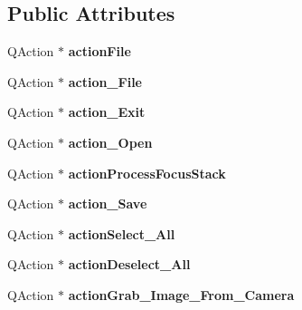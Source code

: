 \subsection*{Public Attributes}
\begin{DoxyCompactItemize}
\item 
\mbox{\label{class_ui___main_window_ae2f5c6fb696d5c3c2adb5be43ae4ab8d}} 
Q\+Action $\ast$ {\bfseries action\+File}
\item 
\mbox{\label{class_ui___main_window_a2a0779eda3ee6e9dceb4fcb319f11d3c}} 
Q\+Action $\ast$ {\bfseries action\+\_\+\+File}
\item 
\mbox{\label{class_ui___main_window_a3710f686be93bfd53122528bd18d08fa}} 
Q\+Action $\ast$ {\bfseries action\+\_\+\+Exit}
\item 
\mbox{\label{class_ui___main_window_a8519e56bcc446c498bcba56d30b3dee4}} 
Q\+Action $\ast$ {\bfseries action\+\_\+\+Open}
\item 
\mbox{\label{class_ui___main_window_adeda788592a9f6400933354b32f3f3f2}} 
Q\+Action $\ast$ {\bfseries action\+Process\+Focus\+Stack}
\item 
\mbox{\label{class_ui___main_window_a20bbf5ae40051241791821693116aaf4}} 
Q\+Action $\ast$ {\bfseries action\+\_\+\+Save}
\item 
\mbox{\label{class_ui___main_window_a69864a890d2467b5a25af9d6ae865cda}} 
Q\+Action $\ast$ {\bfseries action\+Select\+\_\+\+All}
\item 
\mbox{\label{class_ui___main_window_a546e78e85656dc4119cfcffa12f5efdf}} 
Q\+Action $\ast$ {\bfseries action\+Deselect\+\_\+\+All}
\item 
\mbox{\label{class_ui___main_window_a25b03caa5747976616e5497bdf873c1f}} 
Q\+Action $\ast$ {\bfseries action\+Grab\+\_\+\+Image\+\_\+\+From\+\_\+\+Camera}
\item 
\mbox{\label{class_ui___main_window_a926d2c91cef52ec5d03ab4893c24c9ca}} 

\end{DoxyCompactItemize}
